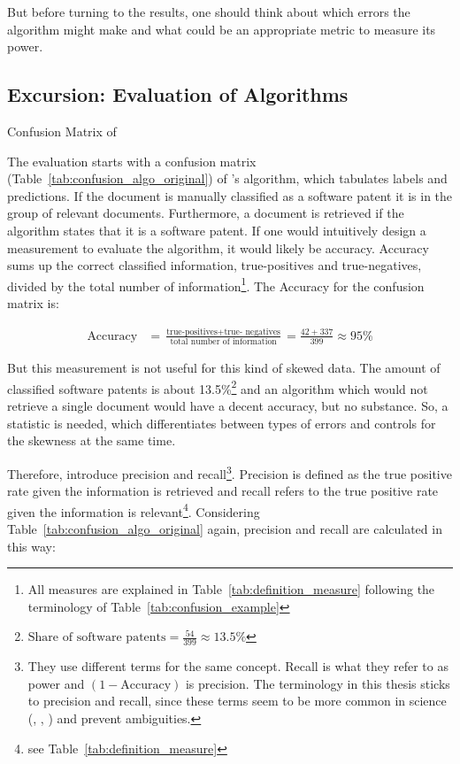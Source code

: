 \documentclass[12pt, a4paper, abstract, parskip]{scrartcl}
\newcommand{\ra}[1]{\renewcommand{\arraystretch}{#1}}
\theoremstyle{definition}
\begin{document}
But before turning to the results, one should think about which errors the
algorithm might make and what could be an appropriate metric to measure its
power.

\subsection{Excursion: Evaluation of Algorithms}

\begin{table}[tb]\caption{Confusion Matrix of \cite{bessen2007empirical}}\label{tab:confusion_algo_original}\centering\ra{1.3}
    
\end{table}

The evaluation starts with a confusion matrix
(Table~\ref{tab:confusion_algo_original}) of \citeauthor{bessen2007empirical}'s
algorithm, which tabulates labels and predictions. If the document is manually
classified as a software patent it is in the group of relevant documents.
Furthermore, a document is retrieved if the algorithm states that it is a
software patent. If one would intuitively design a measurement to evaluate the
algorithm, it would likely be accuracy. Accuracy sums up the correct classified
information, true-positives and true-negatives, divided by the total number of
information\footnote{All measures are explained in
Table~\ref{tab:definition_measure} following the terminology of
Table~\ref{tab:confusion_example}}. The Accuracy for the confusion matrix is:

\begin{align*}
\text{Accuracy} &= \frac{\text{true-positives} + \text{true-
negatives}}{\text{total number of information}} = \frac{42 + 337}{399} \approx
95\%
\end{align*}

But this measurement is not useful for this kind of skewed data. The amount of
classified software patents is about 13.5\%\footnote{$\text{Share of software
patents} = \frac{54}{399} \approx 13.5\%$} and an algorithm which would not
retrieve a single document would have a decent accuracy, but no substance. So,
a statistic is needed, which differentiates between types of errors and
controls for the skewness at the same time.

Therefore, \citeauthor{bessen2007empirical} introduce precision and
recall\footnote{They use different terms for the same concept. Recall is what
they refer to as power and $(1-\text{Accuracy})$ is precision. The terminology
in this thesis sticks to precision and recall, since these terms seem to be
more common in science (\citet[p.~155]{manning2008introduction},
\citet[p.~2]{powers2011evaluation}, \citet[p.~2]{fawcett2006introduction}) and
prevent ambiguities.}. Precision is defined as the true positive rate given the
information is retrieved and recall refers to the true positive rate given the
information is relevant\footnote{see Table~\ref{tab:definition_measure}}.
Considering Table~\ref{tab:confusion_algo_original} again, precision and recall
are calculated in this way:
\end{document}
